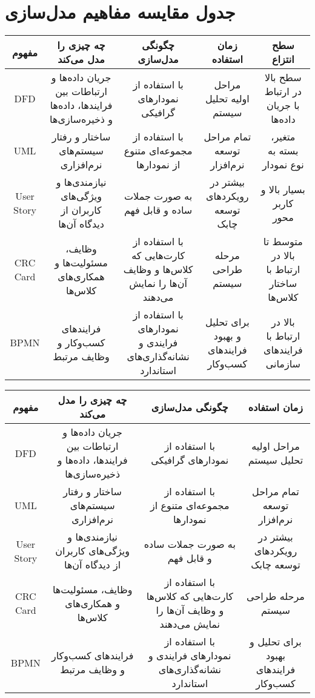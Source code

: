 \section*{جدول مقایسه مفاهیم مدل‌سازی}

\begin{tabular}{|c|c|c|c|c|}
	\hline
	مفهوم & چه چیزی را مدل می‌کند & چگونگی مدل‌سازی & زمان استفاده & سطح انتزاع \\ \hline
	DFD & جریان داده‌ها و ارتباطات بین فرایندها، داده‌ها و ذخیره‌سازی‌ها & با استفاده از نمودارهای گرافیکی & مراحل اولیه تحلیل سیستم & سطح بالا در ارتباط با جریان داده‌ها \\
	UML & ساختار و رفتار سیستم‌های نرم‌افزاری & با استفاده از مجموعه‌ای متنوع از نمودارها & تمام مراحل توسعه نرم‌افزار & متغیر، بسته به نوع نمودار \\
	User Story & نیازمندی‌ها و ویژگی‌های کاربران از دیدگاه آن‌ها & به صورت جملات ساده و قابل فهم & بیشتر در رویکردهای توسعه چابک & بسیار بالا و کاربر محور \\
	CRC Card & وظایف، مسئولیت‌ها و همکاری‌های کلاس‌ها & با استفاده از کارت‌هایی که کلاس‌ها و وظایف آن‌ها را نمایش می‌دهند & مرحله طراحی سیستم & متوسط تا بالا در ارتباط با ساختار کلاس‌ها \\
	BPMN & فرایندهای کسب‌وکار و وظایف مرتبط & با استفاده از نمودارهای فرایندی و نشانه‌گذاری‌های استاندارد & برای تحلیل و بهبود فرایندهای کسب‌وکار & بالا در ارتباط با فرایندهای سازمانی \\
	\hline
\end{tabular}

\begin{tabular}{|c|c|c|c|}
	\hline
	مفهوم & چه چیزی را مدل می‌کند & چگونگی مدل‌سازی & زمان استفاده 
	\\ 
	\hline
	DFD & جریان داده‌ها و ارتباطات بین فرایندها، داده‌ها و ذخیره‌سازی‌ها & با استفاده از نمودارهای گرافیکی & مراحل اولیه تحلیل سیستم \\
	UML & ساختار و رفتار سیستم‌های نرم‌افزاری & با استفاده از مجموعه‌ای متنوع از نمودارها & تمام مراحل توسعه نرم‌افزار \\
	User Story & نیازمندی‌ها و ویژگی‌های کاربران از دیدگاه آن‌ها & به صورت جملات ساده و قابل فهم & بیشتر در رویکردهای توسعه چابک \\
	CRC Card & وظایف، مسئولیت‌ها و همکاری‌های کلاس‌ها & با استفاده از کارت‌هایی که کلاس‌ها و وظایف آن‌ها را نمایش می‌دهند & مرحله طراحی سیستم \\
	BPMN & فرایندهای کسب‌وکار و وظایف مرتبط & با استفاده از نمودارهای فرایندی و نشانه‌گذاری‌های استاندارد & برای تحلیل و بهبود فرایندهای کسب‌وکار \\
	\hline
\end{tabular}

